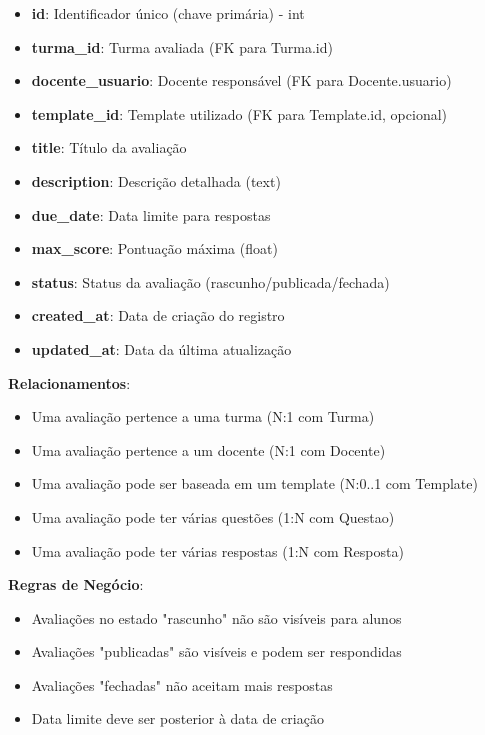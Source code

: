 \documentclass[a4paper,12pt]{article}
\begin{document}
\begin{itemize}
    \item \textbf{id}: Identificador único (chave primária) - int
    \item \textbf{turma\_id}: Turma avaliada (FK para Turma.id)
    \item \textbf{docente\_usuario}: Docente responsável (FK para Docente.usuario)
    \item \textbf{template\_id}: Template utilizado (FK para Template.id, opcional)
    \item \textbf{title}: Título da avaliação
    \item \textbf{description}: Descrição detalhada (text)
    \item \textbf{due\_date}: Data limite para respostas
    \item \textbf{max\_score}: Pontuação máxima (float)
    \item \textbf{status}: Status da avaliação (rascunho/publicada/fechada)
    \item \textbf{created\_at}: Data de criação do registro
    \item \textbf{updated\_at}: Data da última atualização
\end{itemize}

\textbf{Relacionamentos}:
\begin{itemize}
    \item Uma avaliação pertence a uma turma (N:1 com Turma)
    \item Uma avaliação pertence a um docente (N:1 com Docente)
    \item Uma avaliação pode ser baseada em um template (N:0..1 com Template)
    \item Uma avaliação pode ter várias questões (1:N com Questao)
    \item Uma avaliação pode ter várias respostas (1:N com Resposta)
\end{itemize}

\textbf{Regras de Negócio}:
\begin{itemize}
    \item Avaliações no estado "rascunho" não são visíveis para alunos
    \item Avaliações "publicadas" são visíveis e podem ser respondidas
    \item Avaliações "fechadas" não aceitam mais respostas
    \item Data limite deve ser posterior à data de criação
\end{itemize}
\end{document}
